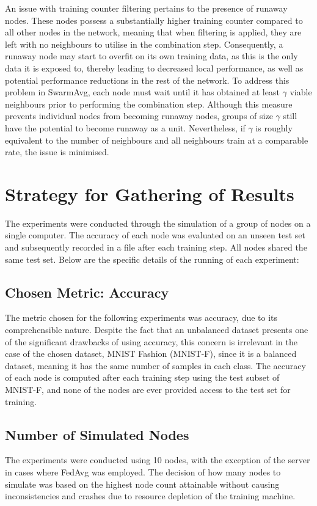 \documentclass[letterpaper, 10 pt, conference]{ieeeconf}  %
\begin{document}
An issue with training counter filtering pertains to the presence of runaway nodes. These nodes possess a substantially higher training counter compared to all other nodes in the network, meaning that when filtering is applied, they are left with no neighbours to utilise in the combination step. Consequently, a runaway node may start to overfit on its own training data, as this is the only data it is exposed to, thereby leading to decreased local performance, as well as potential performance reductions in the rest of the network. To address this problem in SwarmAvg, each node must wait until it has obtained at least $\gamma$ viable neighbours prior to performing the combination step. Although this measure prevents individual nodes from becoming runaway nodes, groups of size $\gamma$ still have the potential to become runaway as a unit. Nevertheless, if $\gamma$ is roughly equivalent to the number of neighbours and all neighbours train at a comparable rate, the issue is minimised.

\section{Strategy for Gathering of Results}\label{strats}
The experiments were conducted through the simulation of a group of nodes on a single computer. The accuracy of each node was evaluated on an unseen test set and subsequently recorded in a file after each training step. All nodes shared the same test set. Below are the specific details of the running of each experiment:

\subsection{Chosen Metric: Accuracy}
The metric chosen for the following experiments was accuracy, due to its comprehensible nature. Despite the fact that an unbalanced dataset presents one of the significant drawbacks of using accuracy, this concern is irrelevant in the case of the chosen dataset, MNIST Fashion (MNIST-F), since it is a balanced dataset, meaning it has the same number of samples in each class. The accuracy of each node is computed after each training step using the test subset of MNIST-F, and none of the nodes are ever provided access to the test set for training.

\subsection{Number of Simulated Nodes}
The experiments were conducted using 10 nodes, with the exception of the server in cases where FedAvg was employed. The decision of how many nodes to simulate was based on the highest node count attainable without causing inconsistencies and crashes due to resource depletion of the training machine.
\end{document}
